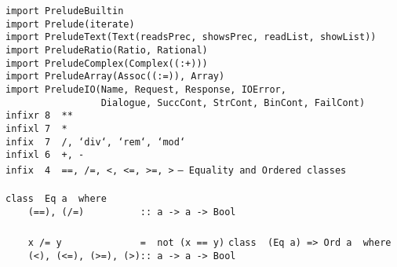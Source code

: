 %
\eprogB\noindent\bprogB
\mbox{\tt import\ PreludeBuiltin}\\
\mbox{\tt import\ Prelude(iterate)}\\
\mbox{\tt import\ PreludeText(Text(readsPrec,\ showsPrec,\ readList,\ showList))}\\
\mbox{\tt import\ PreludeRatio(Ratio,\ Rational)}\\
\mbox{\tt import\ PreludeComplex(Complex((:+)))}\\
\mbox{\tt import\ PreludeArray(Assoc((:=)),\ Array)}\\
\mbox{\tt import\ PreludeIO(Name,\ Request,\ Response,\ IOError,}\\
\mbox{\tt \ \ \ \ \ \ \ \ \ \ \ \ \ \ \ \ \ Dialogue,\ SuccCont,\ StrCont,\ BinCont,\ FailCont)}
%
%
%
%
%
%
%
\eprogB\noindent\bprogB
\mbox{\tt infixr\ 8\ \ **}\\
\mbox{\tt infixl\ 7\ \ *}\\
\mbox{\tt infix\ \ 7\ \ /,\ `div`,\ `rem`,\ `mod`}\\
\mbox{\tt infixl\ 6\ \ +,\ -}\\
\mbox{\tt infix\ \ 4\ \ ==,\ /=,\ <,\ <=,\ >=,\ >}
%
%
%
%
%
%
%
%
%
%
%
%
%
%
\eprogB\noindent\bprogB
\mbox{\tt --\ Equality\ and\ Ordered\ classes}\\
\mbox{\tt }\\[-8pt]
\mbox{\tt class\ \ Eq\ a\ \ where}\\
\mbox{\tt \ \ \ \ (==),\ (/=)\ \ \ \ \ \ \ \ \ \ ::\ a\ ->\ a\ ->\ Bool}\\
\mbox{\tt }\\[-8pt]
\mbox{\tt \ \ \ \ x\ /=\ y\ \ \ \ \ \ \ \ \ \ \ \ \ \ =\ \ not\ (x\ ==\ y)}
%
%
%
\eprogB\noindent\bprogB
\mbox{\tt class\ \ (Eq\ a)\ =>\ Ord\ a\ \ where}\\
\mbox{\tt \ \ \ \ (<),\ (<=),\ (>=),\ (>)::\ a\ ->\ a\ ->\ Bool}\\

